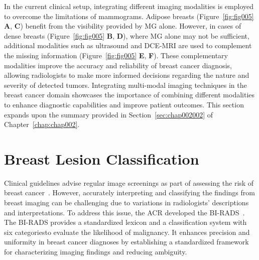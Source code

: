 In the current clinical setup, integrating different imaging modalities is employed to overcome the limitations of mammograms.
Adipose breasts (Figure~\ref{fig:fig005} {\bf A}, {\bf C}) benefit from the visibility provided by \ac{MG} alone.
However, in cases of dense breasts (Figure~\ref{fig:fig005} {\bf B}, {\bf D}), where \ac{MG} alone may not be sufficient, additional modalities such as ultrasound and \ac{DCE-MRI} are used to complement the missing information (Figure~\ref{fig:fig005} {\bf E}, {\bf F}).
These complementary modalities improve the accuracy and reliability of breast cancer diagnosis, allowing radiologists to make more informed decisions regarding the nature and severity of detected tumors.
Integrating multi-modal imaging techniques in the breast cancer domain showcases the importance of combining different modalities to enhance diagnostic capabilities and improve patient outcomes.
This section expands upon the summary provided in Section~\ref{sec:chap002002} of Chapter~\ref{chap:chap002}.

\section{Breast Lesion Classification}
\label{sec:app001003}

Clinical guidelines advise regular image screenings as part of assessing the risk of breast cancer~\cite{MIAO201817}.
However, accurately interpreting and classifying the findings from breast imaging can be challenging due to variations in radiologists' descriptions and interpretations.
To address this issue, the \acf{ACR} developed the \acf{BI-RADS}~\cite{d2018breast}.
The \ac{BI-RADS} provides a standardized lexicon and a classification system with six categories\footnotemark[15] to evaluate the likelihood of malignancy.
It enhances precision and uniformity in breast cancer diagnoses by establishing a standardized framework for characterizing imaging findings and reducing ambiguity.


